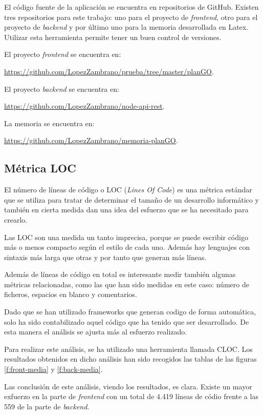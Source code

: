 \documentclass[a4paper, 12pt]{book}
\begin{document}
El c\'odigo fuente de la aplicaci\'on se encuentra en repositorios de GitHub. Existen tres repositorios para este trabajo: uno para el proyecto de  \emph{frontend}, otro para el proyecto de  \emph{backend} y por \'ultimo uno para la memoria desarrollada en Latex. Utilizar esta herramienta permite tener un buen control de versiones.

El proyecto \emph{frontend} se encuentra en:

 \url{https://github.com/LopezZambrano/prueba/tree/master/planGO}.

El proyecto \emph{backend} se encuentra en:

 \url{https://github.com/LopezZambrano/node-api-rest}. 

La memoria se encuentra en:

 \url{https://github.com/LopezZambrano/memoria-planGO}.

\subsection{M\'etrica LOC}
\label{sec:metrica-fuente}

El n\'umero de l\'ineas de c\'odigo o LOC\cite{LOC} (\emph{Lines Of Code}) es una m\'etrica est\'andar que se utiliza para tratar de determinar el tama\~no de un desarrollo inform\'atico y tambi\'en en cierta medida dan una idea del esfuerzo que se ha necesitado para crearlo.

Las LOC son una medida un tanto imprecisa, porque se puede escribir c\'odigo m\'as o menos compacto seg\'un el estilo de cada uno. Adem\'as hay lenguajes con sintaxis m\'as larga que otras y por tanto que generan m\'as l\'ineas.

Adem\'as de l\'ineas de c\'odigo en total es interesante medir tambi\'en algunas m\'etricas relacionadas, como las que han sido medidas en este caso: n\'umero de ficheros, espacios en blanco y comentarios.

Dado que se han utilizado frameworks que generan codigo de forma autom\'atica, solo ha sido contabilizado aquel c\'odigo que ha tenido que ser desarrollado. De esta manera el an\'alisis se ajusta m\'as al esfuerzo realizado.

Para realizar este an\'alisis, se ha utilizado una herramienta llamada CLOC\cite{CLOC}. Los resultados obtenidos en dicho an\'alisis han sido recogidos las tablas de las figuras \ref{f:front-media} y \ref{f:back-media}.

Las conclusi\'on de este an\'alisis, viendo los resultados, es clara. Existe un mayor exfuerzo en la parte de \emph{frontend} con un total de 4.419 l\'ineas de c\'odio frente a las 559 de la parte de \emph{backend}.
\end{document}
